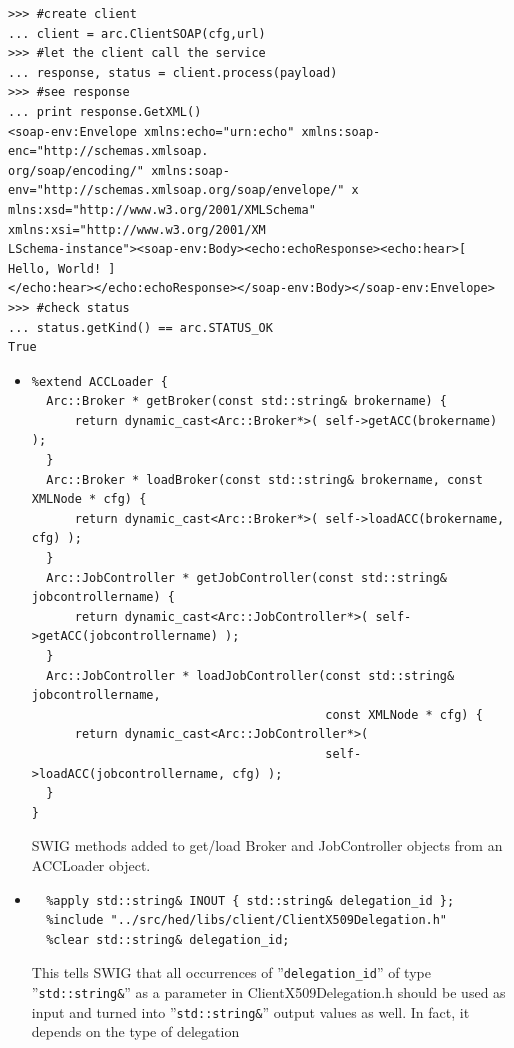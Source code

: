 \documentclass{article}
\begin{document}
\begin{flushleft}
\begin{itemize}
{\begin{example}
\begin{verbatim}
>>> #create client
... client = arc.ClientSOAP(cfg,url)
>>> #let the client call the service
... response, status = client.process(payload)
>>> #see response
... print response.GetXML()
<soap-env:Envelope xmlns:echo="urn:echo" xmlns:soap-enc="http://schemas.xmlsoap.
org/soap/encoding/" xmlns:soap-env="http://schemas.xmlsoap.org/soap/envelope/" x
mlns:xsd="http://www.w3.org/2001/XMLSchema" xmlns:xsi="http://www.w3.org/2001/XM
LSchema-instance"><soap-env:Body><echo:echoResponse><echo:hear>[ Hello, World! ]
</echo:hear></echo:echoResponse></soap-env:Body></soap-env:Envelope>
>>> #check status
... status.getKind() == arc.STATUS_OK
True
\end{verbatim}
    \end{example}
  
  }
\end{itemize}
\begin{itemize}
  \item{ \begin{verbatim}
%extend ACCLoader {
  Arc::Broker * getBroker(const std::string& brokername) { 
      return dynamic_cast<Arc::Broker*>( self->getACC(brokername) ); 
  }
  Arc::Broker * loadBroker(const std::string& brokername, const XMLNode * cfg) { 
      return dynamic_cast<Arc::Broker*>( self->loadACC(brokername, cfg) ); 
  }
  Arc::JobController * getJobController(const std::string& jobcontrollername) { 
      return dynamic_cast<Arc::JobController*>( self->getACC(jobcontrollername) ); 
  }
  Arc::JobController * loadJobController(const std::string& jobcontrollername, 
                                         const XMLNode * cfg) { 
      return dynamic_cast<Arc::JobController*>( 
                                         self->loadACC(jobcontrollername, cfg) ); 
  }
}
  \end{verbatim}
  SWIG methods added to get/load Broker and JobController objects from an ACCLoader object.
  }
\end{itemize}
\begin{itemize}
  \item{ \begin{verbatim}
  %apply std::string& INOUT { std::string& delegation_id };
  %include "../src/hed/libs/client/ClientX509Delegation.h"
  %clear std::string& delegation_id;
  \end{verbatim}
  This tells SWIG that all occurrences of ''\verb$delegation_id$'' of type ''\verb$std::string&$'' 
  as a parameter in ClientX509Delegation.h should be used as input and turned into 
  ''\verb$std::string&$'' output values as well. In fact, it depends on the type of delegation
}
\end{itemize}
\end{flushleft}
\end{document}
